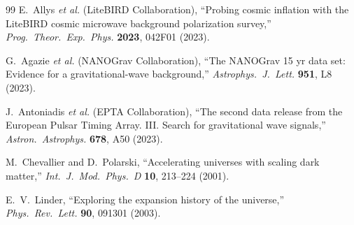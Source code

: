 \documentclass[11pt,a4paper]{article}
\theoremstyle{plain}
\theoremstyle{definition}
\theoremstyle{remark}
\numberwithin{equation}{section}
\begin{document}
\begin{thebibliography}{99}
E.~Allys \textit{et al.} (LiteBIRD Collaboration), ``Probing cosmic inflation with the LiteBIRD cosmic microwave background polarization survey,'' \textit{Prog.\ Theor.\ Exp.\ Phys.} \textbf{2023}, 042F01 (2023).

G.~Agazie \textit{et al.} (NANOGrav Collaboration), ``The NANOGrav 15 yr data set: Evidence for a gravitational-wave background,'' \textit{Astrophys.\ J.\ Lett.} \textbf{951}, L8 (2023).

J.~Antoniadis \textit{et al.} (EPTA Collaboration), ``The second data release from the European Pulsar Timing Array. III. Search for gravitational wave signals,'' \textit{Astron.\ Astrophys.} \textbf{678}, A50 (2023).

M.~Chevallier and D.~Polarski, ``Accelerating universes with scaling dark matter,'' \textit{Int.\ J.\ Mod.\ Phys.\ D} \textbf{10}, 213--224 (2001).

E.~V.~Linder, ``Exploring the expansion history of the universe,'' \textit{Phys.\ Rev.\ Lett.} \textbf{90}, 091301 (2003).

\end{thebibliography}
\end{document}
